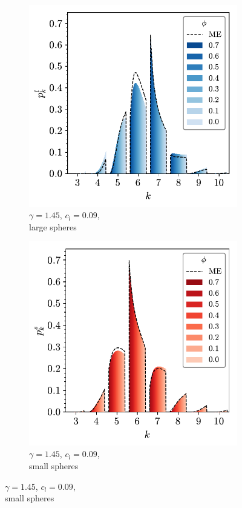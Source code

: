 \begin{figure}[bt]
     \vspace{2mm}
      \begin{subfigure}[b]{0.45\textwidth}
         \centering
         \includegraphics[width=\textwidth]{./figures/quasi2d/phi_me_l_9.pdf}
         \caption{$\gamma=1.45$, $c_l=0.09$, \\large spheres}
         \label{fig:bime3}
     \end{subfigure}
     \hfill
     \begin{subfigure}[b]{0.45\textwidth}
         \centering
         \includegraphics[width=\textwidth]{./figures/quasi2d/phi_me_s_9.pdf}
         \caption{$\gamma=1.45$, $c_l=0.09$, \\small spheres}
         \label{fig:bime4}
     \end{subfigure}
     \hfill
    

\end{figure}
